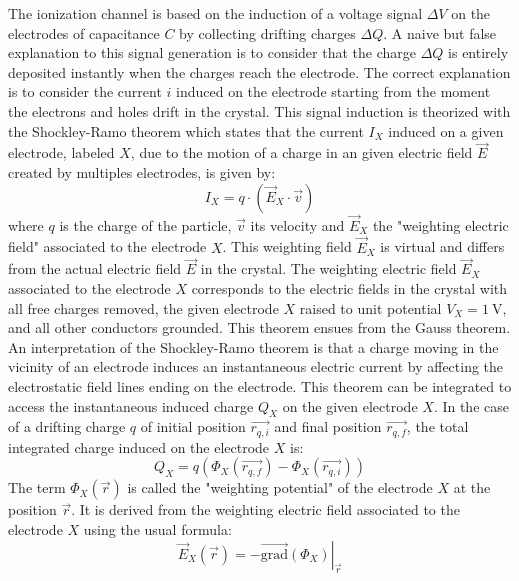 The ionization channel is based on the induction of a voltage signal $\Delta V$ on the electrodes  of capacitance $C$ by collecting drifting charges $\Delta Q$. A naive but false explanation to this signal generation is to consider that the charge $\Delta Q$ is entirely deposited instantly when the charges reach the electrode. The correct explanation is to consider the current $i$ induced on the electrode starting from the moment the electrons and holes drift in the crystal. This signal induction is theorized with the Shockley-Ramo theorem \cite{Shockley:1938itm} \cite{Ramo:1939vr} which states that the current $I_X$ induced on a given electrode, labeled $X$, due to the motion of a charge in an given electric field $\vec{E}$ created by multiples electrodes, is given by:
\begin{equation}
I_X = q \cdot \left( \vec{E}_X \cdot \vec{v} \right)
\end{equation}
where $q$ is the charge of the particle, $\vec{v}$ its velocity and $\vec{E}_X$ the "weighting electric field" associated to the electrode $X$. This weighting field $\vec{E}_X$ is virtual and differs from the actual electric field $\vec{E}$ in the crystal. The weighting electric field $\vec{E}_X$ associated to the electrode $X$ corresponds to the electric fields in the crystal with all free charges removed, the given electrode $X$ raised to unit potential $V_X = \SI{1}{\volt}$, and all other conductors grounded. This theorem ensues from the Gauss theorem.
An interpretation of the Shockley-Ramo theorem is that a charge moving in the vicinity of an electrode induces an instantaneous electric current by affecting the electrostatic field lines ending on the electrode.
This theorem can be integrated to access the instantaneous induced charge $Q_X$ on the given electrode $X$. In the case of a drifting charge $q$ of initial position $\vec{r_{q,i}}$ and final position $\vec{r_{q,f}}$, the total integrated charge induced on the electrode $X$ is:
\begin{equation}
Q_X = q \left( \Phi_X (\vec{r_{q,f}}) - \Phi_X (\vec{r_{q,i}}) \right)
\end{equation}
The term $\Phi_X(\vec{r})$ is called the "weighting potential" of the electrode $X$ at the position $\vec{r}$. It is derived from the weighting electric field associated to the electrode $X$ using the usual formula:
\begin{equation}
\vec{E}_X (\vec{r}) = - \left. \overrightarrow{\mathrm{grad}} \left(  \Phi_X \right)  \right|_{\vec{r}}
\end{equation}
